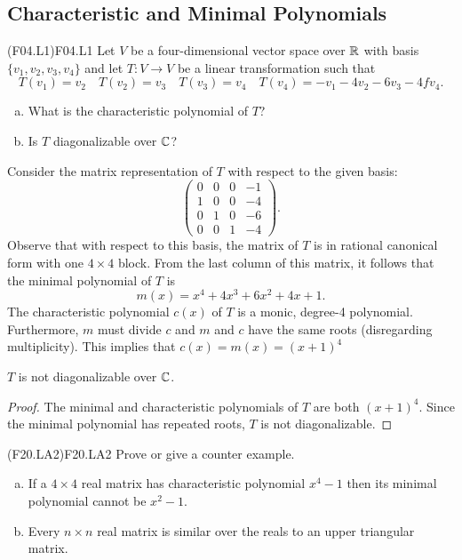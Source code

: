 \documentclass[../AlgebraQualSolutions.tex]{subfiles}
\begin{document}
\subsection{Characteristic and Minimal Polynomials}

\begin{prob}{(F04.L1)}{F04.L1}
	Let $V$ be a four-dimensional vector space over $\mathbb{R}$ with basis $\{v_1,v_2,v_3,v_4\}$ and let $T: V \to V$ be a linear transformation such that
		\[T(v_1) = v_2 \quad T(v_2) = v_3 \quad T(v_3) = v_4 \quad T(v_4) = -v_1 -4v_2 -6v_3 - 4fv_4.\]
	\begin{enumerate}[(a)]
		\item What is the characteristic polynomial of $T$?
		\item Is $T$ diagonalizable over $\mathbb{C}$?
	\end{enumerate}
\end{prob}

\begin{solution}
	Consider the matrix representation of $T$ with respect to the given basis:
		\[\begin{pmatrix}
			0 & 0 & 0 & -1\\
			1 & 0 & 0 & -4\\
			0 & 1 & 0 & -6\\
			0 & 0 & 1 & -4 \end{pmatrix}.\]
		Observe that with respect to this basis, the matrix of $T$ is in rational canonical form with one $4 \times 4$ block. From the last column of this matrix, it follows that the minimal polynomial of $T$ is 
			\[m(x) = x^4 + 4x^3 + 6x^2 + 4x + 1.\]
		The characteristic polynomial $c(x)$ of $T$ is a monic, degree-4 polynomial. Furthermore, $m$ must divide $c$ and $m$ and $c$ have the same roots (disregarding multiplicity). This implies that $c(x) = m(x) = (x + 1)^4$
\end{solution}

\begin{claim}
	$T$ is not diagonalizable over $\mathbb{C}$.

	\begin{proof}
		The minimal and characteristic polynomials of $T$ are both $(x + 1)^4$. Since the minimal polynomial has repeated roots, $T$ is not diagonalizable.
	\end{proof}
\end{claim}

\begin{prob}{(F20.LA2)}{F20.LA2}
	Prove or give a counter example.
	\begin{enumerate}[(a)]
	\item If a $4 \times 4$ real matrix has characteristic polynomial $x^4 -1$ then its minimal polynomial cannot be $x^2 - 1$.
	\item Every $n \times n$ real matrix is similar over the reals to an upper triangular matrix.
	\end{enumerate}
	\end{prob}
	
\end{document}
